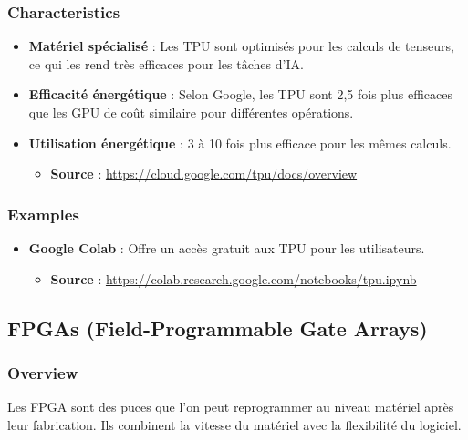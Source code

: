 \documentclass[10pt,a4paper]{article}
\begin{document}
\subsubsection*{Characteristics}
\begin{itemize}
    \item \textbf{Matériel spécialisé} : Les TPU sont optimisés pour les calculs de tenseurs, ce qui les rend très efficaces pour les tâches d'IA.
    \item \textbf{Efficacité énergétique} : Selon Google, les TPU sont 2,5 fois plus efficaces que les GPU de coût similaire pour différentes opérations.
    \item \textbf{Utilisation énergétique} : 3 à 10 fois plus efficace pour les mêmes calculs.
    \begin{itemize}
        \item \textbf{Source} : \url{https://cloud.google.com/tpu/docs/overview}
    \end{itemize}
\end{itemize}

\subsubsection*{Examples}
\begin{itemize}
    \item \textbf{Google Colab} : Offre un accès gratuit aux TPU pour les utilisateurs.
    \begin{itemize}
        \item \textbf{Source} : \url{https://colab.research.google.com/notebooks/tpu.ipynb}
    \end{itemize}
\end{itemize}

\subsection*{FPGAs (Field-Programmable Gate Arrays)}

\subsubsection*{Overview}
Les FPGA sont des puces que l'on peut reprogrammer au niveau matériel après leur fabrication. Ils combinent la vitesse du matériel avec la flexibilité du logiciel.
\end{document}
